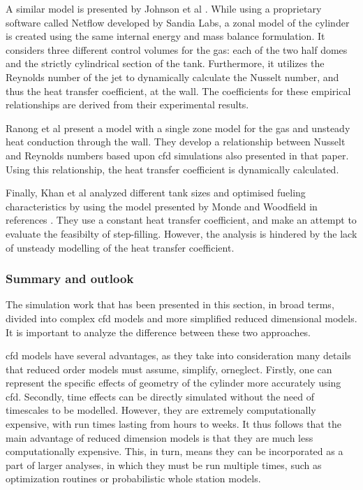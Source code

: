 A similar model is presented by Johnson et al \cite{Johnson2015}. While using a proprietary software called Netflow developed by Sandia Labs,  a zonal model of the cylinder is created using the same internal energy and mass balance formulation. It considers three different control volumes for the gas: each of the two half domes and the strictly cylindrical section of the tank. Furthermore, it utilizes the Reynolds number of the jet to dynamically calculate the Nusselt number, and thus the heat transfer coefficient, at the wall. The coefficients for these empirical relationships are derived from their experimental results.

Ranong et al \cite{Ranong2011} present a model with a single zone model for the gas and unsteady heat conduction through the wall. They develop a relationship between Nusselt and Reynolds numbers based upon \gls{cfd} simulations also presented in that paper. Using this relationship, the heat transfer coefficient is dynamically calculated.

Finally, Khan et al \cite{Khan2009} analyzed different tank sizes and optimised fueling characteristics by using the model presented by Monde and Woodfield in references \cite{Woodfield2008,Monde2007,Monde2012}. They use a constant heat transfer coefficient, and make an attempt to evaluate the feasibilty of step-filling. However, the analysis is hindered by the lack of unsteady modelling of the heat transfer coefficient.

\subsubsection{Summary and outlook}



The simulation work that has been presented in this section, in broad terms, divided into complex \gls{cfd} models and more simplified reduced dimensional models. It is important to analyze the difference between these two approaches. 



\Gls{cfd} models have several advantages, as they take into consideration many details that reduced order models must assume, simplify, orneglect. Firstly, one can represent the specific effects of geometry of the cylinder more accurately using \gls{cfd}. Secondly, time effects can be directly simulated without the need of timescales  to be modelled. However, they are extremely computationally expensive, with run times lasting from hours to weeks. It thus follows that the main advantage of reduced dimension models is that they are much less computationally expensive. This, in turn, means they can be incorporated as a part of larger analyses, in which they must be run multiple times, such as optimization routines or probabilistic whole station models.

